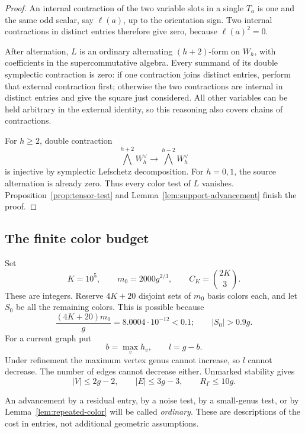 \begin{proof}
An internal contraction of the two variable slots in a single \(T_a\)
is one and the same odd scalar, say \(\ell(a)\), up to the orientation
sign.  Two internal contractions in distinct entries therefore give
zero, because \(\ell(a)^2=0\).

After alternation, \(L\) is an ordinary alternating
\((h+2)\)-form on \(W_h\), with coefficients in the supercommutative
algebra.  Every summand of its double symplectic contraction is zero:
if one contraction joins distinct entries, perform that external
contraction first; otherwise the two contractions are internal in
distinct entries and give the square just considered.  All other
variables can be held arbitrary in the external identity, so this
reasoning also covers chains of contractions.

For \(h\ge2\), double contraction
\[
 \bigwedge^{h+2}W_h^\vee
 \longrightarrow \bigwedge^{h-2}W_h^\vee
\]
is injective by symplectic Lefschetz decomposition.  For \(h=0,1\),
the source alternation is already zero.  Thus every color test of \(L\)
vanishes.  Proposition~\ref{prop:tensor-test} and
Lemma~\ref{lem:support-advancement} finish the proof.
\end{proof}

\subsection{The finite color budget}

Set
\begin{equation}
\label{eq:color-constants}
 K=10^5,\qquad m_0=2000g^{2/3},\qquad
 C_K=\binom{2K}{3}.
\end{equation}
These are integers.  Reserve \(4K+20\) disjoint sets of \(m_0\) basis
colors each, and let \(S_0\) be all the remaining colors.  This is possible
because
\[
 \frac{(4K+20)m_0}{g}
   =8.0004\cdot10^{-12}<0.1;
 \qquad |S_0|>0.9g.
\]
For a current graph put
\[
 b=\max_v h_v,\qquad l=g-b.
\]
Under refinement the maximum vertex genus cannot increase, so \(l\)
cannot decrease.  The number of edges cannot decrease either.
Unmarked stability gives
\begin{equation}
\label{eq:global-noise-bound}
 |V|\le2g-2,\qquad |E|\le3g-3,\qquad R_\Gamma\le10g.
\end{equation}

An advancement by a residual entry, by a noise test, by a small-genus
test, or by Lemma~\ref{lem:repeated-color} will be called
\emph{ordinary}.  These are descriptions of the cost in entries, not
additional geometric assumptions.


